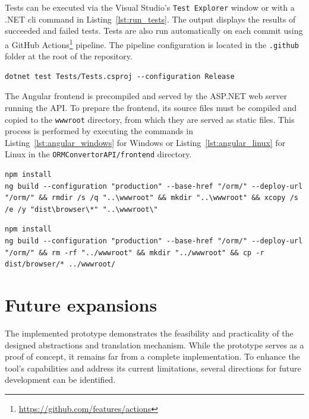 Tests can be executed via the Visual Studio's \texttt{Test Explorer} window or with a .NET \acrshort{cli} command in Listing~\ref{lst:run_tests}. The output displays the results of succeeded and failed tests. Tests are also run automatically on each commit using a GitHub Actions\footnote{\url{https://github.com/features/actions}} pipeline. The pipeline configuration is located in the \texttt{.github} folder at the root of the repository.
\begin{lstlisting}[numbers=none,caption=Test execution command,label=lst:run_tests]
dotnet test Tests/Tests.csproj --configuration Release
\end{lstlisting}

The Angular frontend is precompiled and served by the ASP.NET web server running the API. To prepare the frontend, its source files must be compiled and copied to the \texttt{wwwroot} directory, from which they are served as static files. This process is performed by executing the commands in Listing~\ref{lst:angular_windows} for Windows or Listing~\ref{lst:angular_linux} for Linux in the \texttt{ORMConvertorAPI/frontend} directory.

\begin{lstlisting}[numbers=none,caption=Angular compilation commands (Windows),label=lst:angular_windows]
npm install
ng build --configuration "production" --base-href "/orm/" --deploy-url "/orm/" && rmdir /s /q "..\wwwroot" && mkdir "..\wwwroot" && xcopy /s /e /y "dist\browser\*" "..\wwwroot\"
\end{lstlisting}

\begin{lstlisting}[numbers=none,caption=Angular compilation commands (Linux),label=lst:angular_linux]
npm install
ng build --configuration "production" --base-href "/orm/" --deploy-url "/orm/" && rm -rf "../wwwroot" && mkdir "../wwwroot" && cp -r dist/browser/* ../wwwroot/
\end{lstlisting}

\section{Future expansions}
The implemented prototype demonstrates the feasibility and practicality of the designed abstractions and translation mechanism. While the prototype serves as a proof of concept, it remains far from a complete implementation. To enhance the tool's capabilities and address its current limitations, several directions for future development can be identified. 

